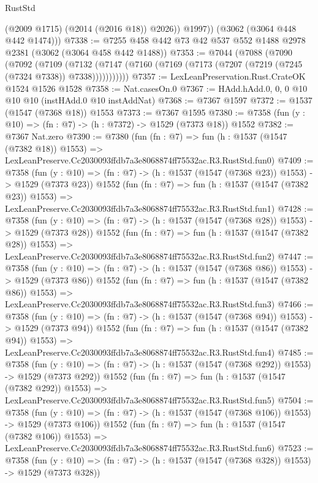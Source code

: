 \begin{lexlean}{RustStd}
\begin{coremodule}
              (@2009 @1715)
              (@2014 (@2016 @18))
              @2026))
          @1997))
      (@3062 (@3064 @448 @442 @1474)))
@7338 := @7255 @458 @442 @73 @42 @537 @552 @1488 @2978 @2381 (@3062 (@3064 @458 @442 @1488))
@7353 := @7044
    (@7088
      (@7090
        (@7092
          (@7109
            (@7132 (@7147 (@7160 (@7169 (@7173 (@7207 (@7219 (@7245 (@7324 @7338)) @7338)))))))))))
@7357 := LexLeanPreservation.Rust.CrateOK @1524 @1526 @1528
@7358 := Nat.casesOn.{0}
@7367 := HAdd.hAdd.{0, 0, 0} @10 @10 @10 (instHAdd.{0} @10 instAddNat)
@7368 := @7367 @1597
@7372 := @1537 (@1547 (@7368 @18)) @1553
@7373 := @7367 @1595
@7380 := @7358 (fun (y : @10) => (fn : @7) -> (h : @7372) -> @1529 (@7373 @18)) @1552
@7382 := @7367 Nat.zero
@7390 := @7380
    (fun (fn : @7) =>
    fun (h : @1537 (@1547 (@7382 @18)) @1553) =>
    LexLeanPreserve.Cc2030093ffdb7a3e8068874ff75532ac.R3.RustStd.fun0)
@7409 := @7358
    (fun (y : @10) => (fn : @7) -> (h : @1537 (@1547 (@7368 @23)) @1553) -> @1529 (@7373 @23))
    @1552
    (fun (fn : @7) =>
    fun (h : @1537 (@1547 (@7382 @23)) @1553) =>
    LexLeanPreserve.Cc2030093ffdb7a3e8068874ff75532ac.R3.RustStd.fun1)
@7428 := @7358
    (fun (y : @10) => (fn : @7) -> (h : @1537 (@1547 (@7368 @28)) @1553) -> @1529 (@7373 @28))
    @1552
    (fun (fn : @7) =>
    fun (h : @1537 (@1547 (@7382 @28)) @1553) =>
    LexLeanPreserve.Cc2030093ffdb7a3e8068874ff75532ac.R3.RustStd.fun2)
@7447 := @7358
    (fun (y : @10) => (fn : @7) -> (h : @1537 (@1547 (@7368 @86)) @1553) -> @1529 (@7373 @86))
    @1552
    (fun (fn : @7) =>
    fun (h : @1537 (@1547 (@7382 @86)) @1553) =>
    LexLeanPreserve.Cc2030093ffdb7a3e8068874ff75532ac.R3.RustStd.fun3)
@7466 := @7358
    (fun (y : @10) => (fn : @7) -> (h : @1537 (@1547 (@7368 @94)) @1553) -> @1529 (@7373 @94))
    @1552
    (fun (fn : @7) =>
    fun (h : @1537 (@1547 (@7382 @94)) @1553) =>
    LexLeanPreserve.Cc2030093ffdb7a3e8068874ff75532ac.R3.RustStd.fun4)
@7485 := @7358
    (fun (y : @10) => (fn : @7) -> (h : @1537 (@1547 (@7368 @292)) @1553) -> @1529 (@7373 @292))
    @1552
    (fun (fn : @7) =>
    fun (h : @1537 (@1547 (@7382 @292)) @1553) =>
    LexLeanPreserve.Cc2030093ffdb7a3e8068874ff75532ac.R3.RustStd.fun5)
@7504 := @7358
    (fun (y : @10) => (fn : @7) -> (h : @1537 (@1547 (@7368 @106)) @1553) -> @1529 (@7373 @106))
    @1552
    (fun (fn : @7) =>
    fun (h : @1537 (@1547 (@7382 @106)) @1553) =>
    LexLeanPreserve.Cc2030093ffdb7a3e8068874ff75532ac.R3.RustStd.fun6)
@7523 := @7358
    (fun (y : @10) => (fn : @7) -> (h : @1537 (@1547 (@7368 @328)) @1553) -> @1529 (@7373 @328))

\end{coremodule}
\end{lexlean}
